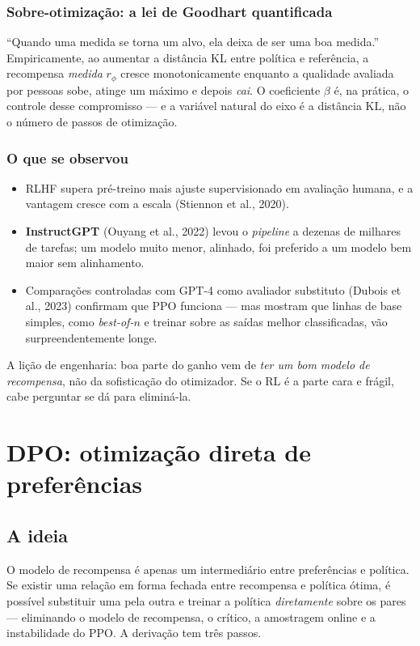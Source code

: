 \documentclass[11pt, a4paper]{article}
\newcommand{\rphi}{r_{\phi}}
\begin{document}
\subsubsection*{Sobre-otimização: a lei de Goodhart quantificada}

``Quando uma medida se torna um alvo, ela deixa de ser uma boa medida.''
Empiricamente, ao aumentar a distância KL entre política e referência, a
recompensa \emph{medida} $\rphi$ cresce monotonicamente enquanto a qualidade
avaliada por pessoas sobe, atinge um máximo e depois \emph{cai}. O coeficiente
$\beta$ é, na prática, o controle desse compromisso --- e a variável natural do
eixo é a distância KL, não o número de passos de otimização.

\subsubsection*{O que se observou}

\begin{itemize}
  \item RLHF supera pré-treino mais ajuste supervisionado em avaliação humana, e
    a vantagem cresce com a escala (Stiennon et al., 2020).
  \item \textbf{InstructGPT} (Ouyang et al., 2022) levou o \emph{pipeline} a
    dezenas de milhares de tarefas; um modelo muito menor, alinhado, foi
    preferido a um modelo bem maior sem alinhamento.
  \item Comparações controladas com GPT-4 como avaliador substituto (Dubois et
    al., 2023) confirmam que PPO funciona --- mas mostram que linhas de base
    simples, como \emph{best-of-$n$} e treinar sobre as saídas melhor
    classificadas, vão surpreendentemente longe.
\end{itemize}

A lição de engenharia: boa parte do ganho vem de \emph{ter um bom modelo de
recompensa}, não da sofisticação do otimizador. Se o RL é a parte cara e frágil,
cabe perguntar se dá para eliminá-la.

\section{DPO: otimização direta de preferências}

\subsection{A ideia}

O modelo de recompensa é apenas um intermediário entre preferências e política.
Se existir uma relação em forma fechada entre recompensa e política ótima, é
possível substituir uma pela outra e treinar a política \emph{diretamente} sobre
os pares --- eliminando o modelo de recompensa, o crítico, a amostragem online e
a instabilidade do PPO. A derivação tem três passos.
\end{document}
